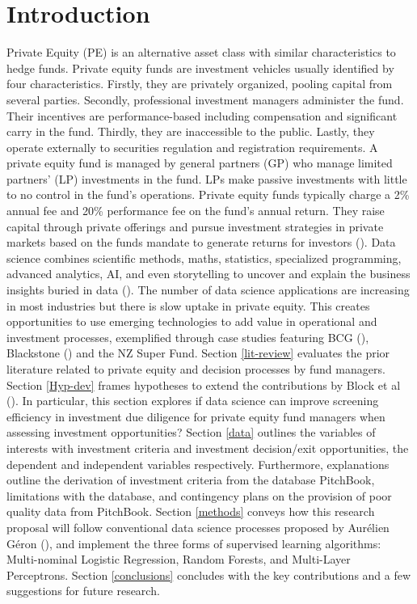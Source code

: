 \documentclass[12pt]{article}
\begin{document}
\section{Introduction}\label{intro}
Private Equity (PE) is an alternative asset class with similar characteristics to hedge funds.
Private equity funds are investment vehicles usually identified by four characteristics. 
Firstly, they are privately organized, pooling capital from several parties.
Secondly, professional investment managers administer the fund. Their incentives are performance-based including compensation and significant carry in the fund.
Thirdly, they are inaccessible to the public.
Lastly, they operate externally to securities regulation and registration requirements.
A private equity fund is managed by general partners (GP) who manage limited partners' (LP) investments in the fund. 
LPs make passive investments with little to no control in the fund's operations. 
Private equity funds typically charge a 2\% annual fee and 20\% performance fee on the fund's annual return.
They raise capital through private offerings and pursue investment strategies in private markets based on the funds mandate to generate returns for investors (\cite{brav2008hedge}).
Data science combines scientific methods, maths, statistics, specialized programming, advanced analytics, AI, and even storytelling to uncover and explain the business insights buried in data (\cite{IBM}).
The number of data science applications are increasing in most industries but there is slow uptake in private equity. 
This creates opportunities to use emerging technologies to add value in operational and investment processes, 
exemplified through case studies featuring BCG (\citeyear{BCG}), Blackstone (\citeyear{BBBS}) and the NZ Super Fund.
Section \ref{lit-review} evaluates the prior literature related to private equity and decision processes by fund managers.
Section \ref{Hyp-dev} frames hypotheses to extend the contributions by Block et al (\citeyear{BLOCK2019329}).
In particular, this section explores if data science can improve screening efficiency in investment due diligence for private equity fund managers when assessing investment opportunities?
Section \ref{data} outlines the variables of interests with investment criteria and investment decision/exit opportunities, the dependent and independent variables respectively.
Furthermore, explanations outline the derivation of investment criteria from the database PitchBook, limitations with the database, and contingency plans on the provision of poor quality data from PitchBook.
Section \ref{methods} conveys how this research proposal will follow conventional data science processes proposed by Aur{\'e}lien G{\'e}ron (\citeyear{aurelien2017hands}), and implement the three forms of supervised learning algorithms:
Multi-nominal Logistic Regression, Random Forests, and Multi-Layer Perceptrons.
Section \ref{conclusions} concludes with the key contributions and a few suggestions for future research.
\end{document}
